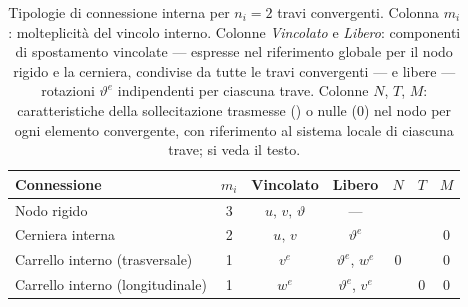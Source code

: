 \begin{table}[htbp]
	\centering
	\renewcommand{\arraystretch}{1.6}
	\begin{tabular}{lcccccc}
		\toprule
		\textbf{Connessione} & $m_i$ & \textbf{Vincolato} &
		\textbf{Libero} & $N$ & $T$ & $M$ \\
		\midrule
		Nodo rigido      & 3 & $u,\,v,\,\vartheta$ & --- &
		\checkmark & \checkmark & \checkmark \\
		Cerniera interna & 2 & $u,\,v$ & $\vartheta^e$ &
		\checkmark & \checkmark & $0$ \\
		Carrello interno (trasversale) & 1 & $v^e$ & $\vartheta^e$, $w^e$ &
		$0$ & \checkmark & $0$ \\
		Carrello interno (longitudinale) & 1 & $w^e$ & $\vartheta^e$, $v^e$ &
		\checkmark & $0$ & $0$ \\
		\bottomrule
	\end{tabular}
	\caption{Tipologie di connessione interna per $n_i = 2$
		travi convergenti. Colonna $m_i$: molteplicità
		del vincolo interno. Colonne \emph{Vincolato}
		e \emph{Libero}: componenti di spostamento
		vincolate --- espresse nel riferimento globale per il nodo rigido e la cerniera,
		condivise da tutte le travi convergenti --- e
		libere --- rotazioni $\vartheta^e$ indipendenti
		per ciascuna trave. Colonne $N$, $T$, $M$:
		caratteristiche della sollecitazione trasmesse
		(\checkmark) o nulle ($0$) nel nodo per ogni
		elemento convergente, con riferimento al sistema
		locale di ciascuna trave; si veda il testo.}
	\label{tab:connessioni}
\end{table}

